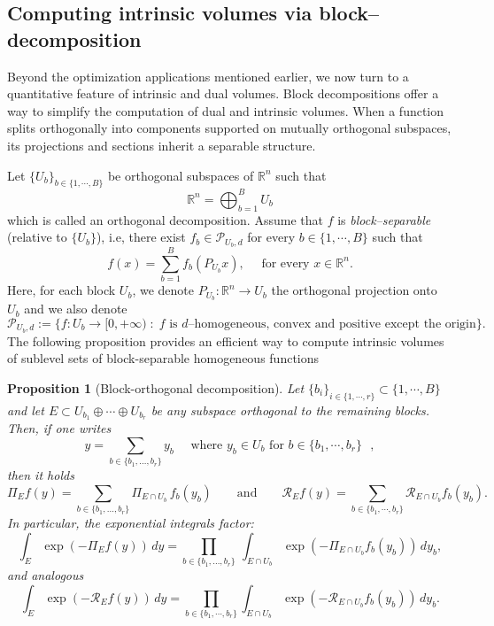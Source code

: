\documentclass[11pt]{article}
\newtheorem{proposition}[theorem]{Proposition}
\theoremstyle{definition}
\numberwithin{equation}{section}
\newcommand{\R}{\mathbb{R}}
\newcommand{\cP}{\mathcal{P}}        %
\begin{document}
\subsection{Computing intrinsic volumes via block--decomposition}
Beyond the optimization applications mentioned earlier, we now turn to a quantitative feature of intrinsic and dual volumes.  
Block decompositions offer a way to simplify the computation of  dual and intrinsic volumes.
When a function splits orthogonally into components supported on mutually orthogonal subspaces, its projections and sections inherit a separable structure. 

\medskip

Let $\{ U_b \}_{b \in \{1, \cdots, B\}}$ be orthogonal subspaces of $\R^n$ such that
\[
\R^n = \bigoplus_{b=1}^B U_b
\]
which is called an orthogonal decomposition.
Assume that $f$ is \textit{block--separable} (relative to $\{ U_b \}$), i.e, there exist $f_b \in \cP_{U_b, d}$ for every $b \in \{1, \cdots, B \}$ such that  
\[
f(x) = \sum_{b=1}^B f_b(P_{U_b}x), \quad \text{ for every } x \in \R^n.
\]
Here, for each block $U_b$, we denote $P_{U_b}: \R^n \longrightarrow U_b$ the orthogonal projection onto $U_b$ and we also denote
\[
\cP_{U_b,d} :=  \big\{ f: U_b \to [0, +\infty) \;:\; f \text{ is $d$--homogeneous, convex and positive except the origin} \big\}.
\]
The following proposition provides an efficient way to compute intrinsic volumes of sublevel sets of block-separable homogeneous functions

\begin{proposition}[Block-orthogonal decomposition]\label{prop:block-separable}
Let $\{ b_i \}_{i \in \{1, \cdots, r \}} \subset \{1, \cdots, B \}$ and let $E\subset U_{b_1}\oplus\cdots\oplus U_{b_r}$ be any subspace orthogonal to the remaining blocks. 
Then, if one writes
\[
y=\sum_{b\in\{b_1,\dots,b_r\}} y_b \quad \text{ where $y_b\in U_b$ for $b \in \{b_1, \cdots, b_r \}$ },
\]
then it holds
\[
\Pi_E f(y)=\sum_{b\in\{b_1,\dots,b_r\}} \Pi_{E\cap U_b}\,f_b(y_b)
\qquad\text{and}\qquad
\mathscr R_E f(y) = \sum_{b \in \{b_1, \cdots, b_r\}} \mathscr R_{E\cap U_b} f_b(y_b).
\]
In particular, the exponential integrals factor:
\begin{equation}\label{id_Pi_block}
\int_E \exp(-\Pi_E f(y))\,dy=\prod_{b\in\{b_1,\dots,b_r\}}\ \int_{E\cap U_b} \exp(-\Pi_{E\cap U_b} f_b(y_b)) \,dy_b,
\end{equation}
and analogous
\begin{equation}
    \int_E \exp(- \mathscr R_E f(y)) \, dy = \prod_{b \in \{b_1, \cdots, b_r \}} \int_{E \cap U_b} \exp(- \mathscr R_{E \cap U_b} f_b(y_b)) \, dy_b.
\end{equation}
\end{proposition}
\end{document}

